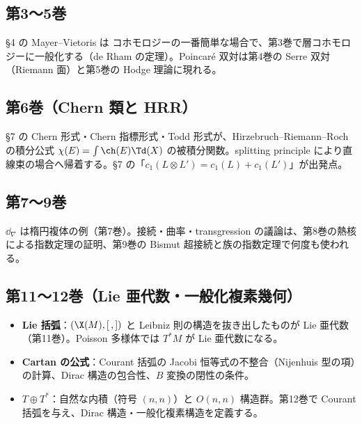 \subsection{第3〜5巻}
§4 の Mayer--Vietoris は \Cech{} コホモロジーの一番簡単な場合で、第3巻で層コホモロジーに一般化する（de Rham の定理）。Poincar\'e 双対は第4巻の Serre 双対（Riemann 面）と第5巻の Hodge 理論に現れる。
\subsection{第6巻（Chern 類と HRR）}
§7 の Chern 形式・Chern 指標形式・Todd 形式が、Hirzebruch--Riemann--Roch の積分公式 $\chi(E)=\int\ch(E)\Td(X)$ の被積分関数。splitting principle により直線束の場合へ帰着する。§7 の「$c_1(L\otimes L')=c_1(L)+c_1(L')$」が出発点。
\subsection{第7〜9巻}
$\dd_\nabla$ は楕円複体の例（第7巻）。接続・曲率・transgression の議論は、第8巻の熱核による指数定理の証明、第9巻の Bismut 超接続と族の指数定理で何度も使われる。
\subsection{第11〜12巻（Lie 亜代数・一般化複素幾何）}
\begin{itemize}
\item \textbf{Lie 括弧}：$(\X(M),[\,,])$ と Leibniz 則の構造を抜き出したものが Lie 亜代数（第11巻）。Poisson 多様体では $T^*M$ が Lie 亜代数になる。
\item \textbf{Cartan の公式}：Courant 括弧の Jacobi 恒等式の不整合（Nijenhuis 型の項）の計算、Dirac 構造の包合性、$B$ 変換の閉性の条件。
\item \textbf{$T\oplus T^*$}：自然な内積（符号 $(n,n)$）と $O(n,n)$ 構造群。第12巻で Courant 括弧を与え、Dirac 構造・一般化複素構造を定義する。
\end{itemize}
